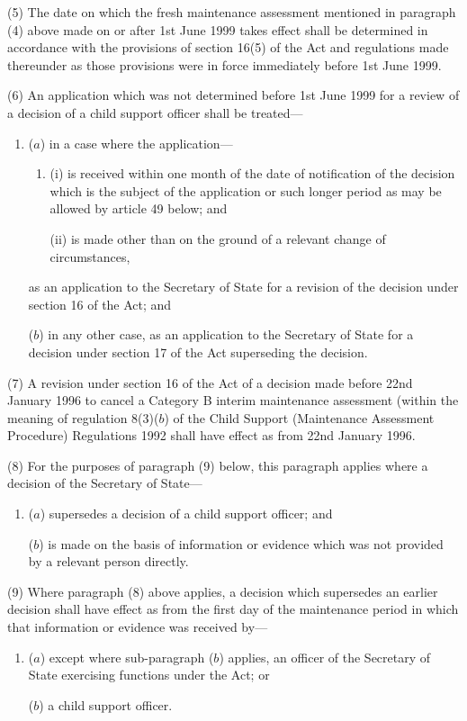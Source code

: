 \documentclass[12pt,a4paper]{article}
\begin{document}
(5) The date on which the fresh maintenance assessment mentioned in paragraph (4) above made on or after 1st June 1999 takes effect shall be determined in accordance with the provisions of section 16(5) of the Act and regulations made thereunder as those provisions were in force immediately before 1st June 1999.

(6) An application which was not determined before 1st June 1999 for a review of a decision of a child support officer shall be treated—
\begin{enumerate}\item[]
($a$) in a case where the application—
\begin{enumerate}\item[]
(i) is received within one month of the date of notification of the decision which is the subject of the application or such longer period as may be allowed by article 49 below; and

(ii) is made other than on the ground of a relevant change of circumstances,
\end{enumerate}
as an application to the Secretary of State for a revision of the decision under section 16 of the Act; and

($b$) in any other case, as an application to the Secretary of State for a decision under section 17 of the Act superseding the decision.
\end{enumerate}

(7) A revision under section 16 of the Act of a decision made before 22nd January 1996 to cancel a Category B interim maintenance assessment (within the meaning of regulation 8(3)($b$) of the Child Support (Maintenance Assessment Procedure) Regulations 1992 shall have effect as from 22nd January 1996.

(8) For the purposes of paragraph (9) below, this paragraph applies where a decision of the Secretary of State—
\begin{enumerate}\item[]
($a$) supersedes a decision of a child support officer; and

($b$) is made on the basis of information or evidence which was not provided by a relevant person directly.
\end{enumerate}

(9) Where paragraph (8) above applies, a decision which supersedes an earlier decision shall have effect as from the first day of the maintenance period in which that information or evidence was received by—
\begin{enumerate}\item[]
($a$) except where sub-paragraph ($b$) applies, an officer of the Secretary of State exercising functions under the Act; or

($b$) a child support officer.
\end{enumerate}
\end{document}
